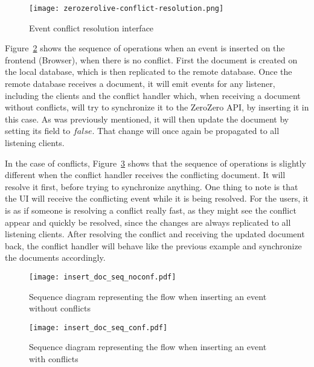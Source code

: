 \begin{figure}[ht]
    \begin{center}
        \leavevmode
        \texttt{[image: zerozerolive-conflict-resolution.png]}
        \caption{Event conflict resolution interface}
        \label{fig:zerozerolive-conflict-resolution}
    \end{center}
\end{figure}

Figure~\ref{fig:insert_doc_seq_noconf} shows the sequence of operations when an event is inserted on the frontend (Browser), when there is no conflict. First the document is created on the local database, which is then replicated to the remote database. Once the remote database receives a document, it will emit events for any listener, including the clients and the conflict handler which, when receiving a document without conflicts, will try to synchronize it to the ZeroZero API, by inserting it in this case. As was previously mentioned, it will then update the document by setting its  field to $false$. That change will once again be propagated to all listening clients.

In the case of conflicts, Figure~\ref{fig:insert_doc_seq_conf} shows that the sequence of operations is slightly different when the conflict handler receives the conflicting document. It will resolve it first, before trying to synchronize anything. One thing to note is that the UI will receive the conflicting event while it is being resolved. For the users, it is as if someone is resolving a conflict really fast, as they might see the conflict appear and quickly be resolved, since the changes are always replicated to all listening clients. After resolving the conflict and receiving the updated document back, the conflict handler will behave like the previous example and synchronize the documents accordingly.

\begin{figure}[ht]
    \begin{center}
        \leavevmode
        \texttt{[image: insert\_doc\_seq\_noconf.pdf]}
        \caption{Sequence diagram representing the flow when inserting an event without conflicts}
        \label{fig:insert_doc_seq_noconf}
    \end{center}
\end{figure}

\begin{figure}[ht]
    \begin{center}
        \leavevmode
        \texttt{[image: insert\_doc\_seq\_conf.pdf]}
        \caption{Sequence diagram representing the flow when inserting an event with conflicts}
        \label{fig:insert_doc_seq_conf}
    \end{center}
\end{figure}

